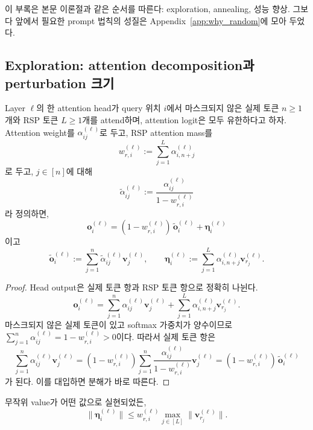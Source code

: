 이 부록은 본문 이론절과 같은 순서를 따른다: exploration, annealing, 성능 향상. 그보다 앞에서 필요한 prompt 법칙의 성질은 Appendix~\ref{app:why_random}에 모아 두었다.

\subsection{Exploration: attention decomposition과 perturbation 크기}\label{app:rsp_noise}

\begin{proposition}\label{prop:attention_decomposition}
Layer $\ell$의 한 attention head가 query 위치 $i$에서 마스크되지 않은 실제 토큰 $n\ge1$개와 RSP 토큰 $L\ge1$개를 attend하며, attention logit은 모두 유한하다고 하자. Attention weight를 $\alpha_{ij}^{(\ell)}$로 두고, RSP attention mass를
\[
w_{r,i}^{(\ell)} := \sum_{j=1}^{L}\alpha_{i,n+j}^{(\ell)}
\]
로 두고, $j\in[n]$에 대해
\[
\tilde{\alpha}_{ij}^{(\ell)} := \frac{\alpha_{ij}^{(\ell)}}{1-w_{r,i}^{(\ell)}}
\]
라 정의하면,
\[
\mathbf{o}_i^{(\ell)}
=
(1-w_{r,i}^{(\ell)})\,\tilde{\mathbf{o}}_i^{(\ell)}
+
\boldsymbol{\eta}_i^{(\ell)}
\]
이고
\[
\tilde{\mathbf{o}}_i^{(\ell)} := \sum_{j=1}^{n}\tilde{\alpha}_{ij}^{(\ell)}\mathbf{v}_j^{(\ell)},
\qquad
\boldsymbol{\eta}_i^{(\ell)} := \sum_{j=1}^{L}\alpha_{i,n+j}^{(\ell)}\mathbf{v}_{r_j}^{(\ell)}.
\]
\end{proposition}

\begin{proof}
Head output은 실제 토큰 항과 RSP 토큰 항으로 정확히 나뉜다.
\[
\mathbf{o}_i^{(\ell)}
=
\sum_{j=1}^{n}\alpha_{ij}^{(\ell)}\mathbf{v}_j^{(\ell)}
+
\sum_{j=1}^{L}\alpha_{i,n+j}^{(\ell)}\mathbf{v}_{r_j}^{(\ell)}.
\]
마스크되지 않은 실제 토큰이 있고 softmax 가중치가 양수이므로 $\sum_{j=1}^{n}\alpha_{ij}^{(\ell)}=1-w_{r,i}^{(\ell)}>0$이다. 따라서 실제 토큰 항은
\[
\sum_{j=1}^{n}\alpha_{ij}^{(\ell)}\mathbf{v}_j^{(\ell)}
=
(1-w_{r,i}^{(\ell)})\sum_{j=1}^{n}\frac{\alpha_{ij}^{(\ell)}}{1-w_{r,i}^{(\ell)}}\mathbf{v}_j^{(\ell)}
=
(1-w_{r,i}^{(\ell)})\,\tilde{\mathbf{o}}_i^{(\ell)}
\]
가 된다. 이를 대입하면 분해가 바로 따른다.
\end{proof}

\begin{corollary}\label{cor:perturbation_magnitude}
무작위 value가 어떤 값으로 실현되었든,
\[
\|\boldsymbol{\eta}_i^{(\ell)}\|
\le
w_{r,i}^{(\ell)} \max_{j\in[L]}\|\mathbf{v}_{r_j}^{(\ell)}\|.
\]
\end{corollary}

